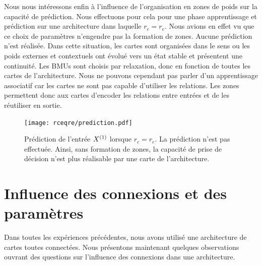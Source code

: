 \documentclass[../main]{subfiles}
\begin{document}
Nous nous intéressons enfin à l'influence de l'organisation en zones de poids sur la capacité de prédiction.
Nous effectuons pour cela pour une phase apprentissage et prédiction sur une architecture dans laquelle $r_c = r_e$. Nous avions en effet vu que ce choix de paramètres n'engendre pas la formation de zones.
Aucune prédiction n'est réalisée. 
Dans cette situation, les cartes sont \og organisées \fg{} dans le sens ou les poids externes et contextuels ont évolué vers un état stable et présentent une continuité. Les BMUs sont choisis par relaxation, donc en fonction de toutes les cartes de l'architecture. Nous ne pouvons cependant pas parler d'un apprentissage associatif car les cartes ne sont pas capable d'utiliser les relations. Les zones permettent donc aux cartes d'encoder les relations entre entrées et de les réutiliser en sortie.



\begin{figure}[h!]
	\centering\texttt{[image: rceqre/prediction.pdf]}
	\caption{Prédiction de l'entrée $X^{({1})}$ lorsque $r_c = r_e$. La prédiction n'est pas effectuée. Ainsi, sans formation de zones, la capacité de prise de décision n'est plus réalisable par une carte de l'architecture. \label{fig:rcre_pred}}
\end{figure}
	

\section{Influence des connexions et des paramètres}

Dans toutes les expériences précédentes, nous avons utilisé une architecture de cartes toutes connectées. Nous présentons maintenant quelques observations ouvrant des questions sur l'influence des connexions dans une architecture.
\end{document}
